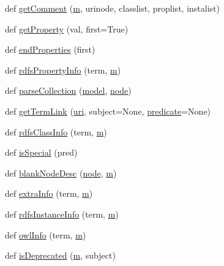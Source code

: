 \begin{DoxyCompactItemize}
\item 
def \hyperlink{namespacelv2specgen_a6bc018e504630566167df7af490d04ea}{get\+Comment} (\hyperlink{layer3_8c_a4b8bfe70f28d6faddcb10d6ecf8c1989}{m}, urinode, classlist, proplist, instalist)
\item 
def \hyperlink{namespacelv2specgen_a881bc16e0f37c26d21f3f955f6b5093d}{get\+Property} (val, first=True)
\item 
def \hyperlink{namespacelv2specgen_a087c6c4129f50d619aa76cfe2fd339f4}{end\+Properties} (first)
\item 
def \hyperlink{namespacelv2specgen_a9e288c2bb5fa0d00c9fa5ad992e3c8a7}{rdfs\+Property\+Info} (term, \hyperlink{layer3_8c_a4b8bfe70f28d6faddcb10d6ecf8c1989}{m})
\item 
def \hyperlink{namespacelv2specgen_a4017ce24611f6202e0011276c982d8cb}{parse\+Collection} (\hyperlink{lib_2expat_8h_ac517f0c27408fbd365e7dd34e032faca}{model}, \hyperlink{structnode}{node})
\item 
def \hyperlink{namespacelv2specgen_a1070febeab0867243d903f11599f9762}{get\+Term\+Link} (\hyperlink{lib_2expat_8h_a5a9fdd6c2606370ad12f24c078ac6585}{uri}, subject=None, \hyperlink{xlmath_8c_a767c5fa064d0a1e1f8b447769f1a890b}{predicate}=None)
\item 
def \hyperlink{namespacelv2specgen_ad5bddd7ec3a45bf60b14ca81acdf9241}{rdfs\+Class\+Info} (term, \hyperlink{layer3_8c_a4b8bfe70f28d6faddcb10d6ecf8c1989}{m})
\item 
def \hyperlink{namespacelv2specgen_a51c9f6913511090d6239ad5012776d20}{is\+Special} (pred)
\item 
def \hyperlink{namespacelv2specgen_ab4271fdac2b3040f2a4ebbeb9ff87c93}{blank\+Node\+Desc} (\hyperlink{structnode}{node}, \hyperlink{layer3_8c_a4b8bfe70f28d6faddcb10d6ecf8c1989}{m})
\item 
def \hyperlink{namespacelv2specgen_ae13bee880dcaf30932d27d2010a1af7f}{extra\+Info} (term, \hyperlink{layer3_8c_a4b8bfe70f28d6faddcb10d6ecf8c1989}{m})
\item 
def \hyperlink{namespacelv2specgen_a03c2091d21c28e06594c876f02540eb4}{rdfs\+Instance\+Info} (term, \hyperlink{layer3_8c_a4b8bfe70f28d6faddcb10d6ecf8c1989}{m})
\item 
def \hyperlink{namespacelv2specgen_a408ea13198bf04c5cbcf0be3b06f5486}{owl\+Info} (term, \hyperlink{layer3_8c_a4b8bfe70f28d6faddcb10d6ecf8c1989}{m})
\item 
def \hyperlink{namespacelv2specgen_a68c5993fd7076570ed304c8a769ec5ac}{is\+Deprecated} (\hyperlink{layer3_8c_a4b8bfe70f28d6faddcb10d6ecf8c1989}{m}, subject)

\end{DoxyCompactItemize}
